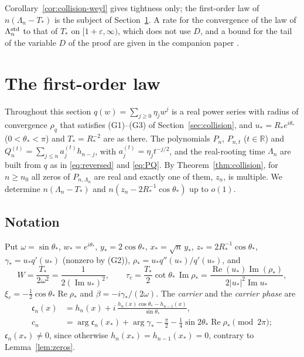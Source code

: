 \documentclass[11pt]{amsart}
\theoremstyle{definition}
\theoremstyle{remark}
\numberwithin{equation}{section}
\newcommand{\R}{\mathbb{R}}
\newcommand{\eps}{\varepsilon}
\DeclareMathOperator{\re}{Re}
\DeclareMathOperator{\im}{Im}
\begin{document}
Corollary~\ref{cor:collision-weyl} gives tightness only; the first-order law of $n(\Lambda_n-T_*)$ is the subject of Section~\ref{sec:firstorder}. A rate for the convergence of the law of $\Lambda_n^{\rm std}$ to that of $T_*$ on $[1+\eps,\infty)$, which does not use $D$, and a bound for the tail of the variable $D$ of the proof are given in the companion paper \cite{CompA}. %


\section{The first-order law}\label{sec:firstorder}

Throughout this section $q(w)=\sum_{j\ge0}\eta_jw^j$ is a real power series with radius of convergence $\rho_q$ that
satisfies (G1)--(G3) of Section~\ref{sec:collision}, and $u_*=R_*e^{i\theta_*}$ ($0<\theta_*<\pi$) and $T_*=R_*^{-2}$
are as there. The polynomials $P_n$, $P_{n,t}$ ($t\in\R$) and $Q_n^{(t)}=\sum_{j\le n}a^{(t)}_jh_{n-j}$, with
$a^{(t)}_j=\eta_jt^{-j/2}$, and the real-rooting time $\Lambda_n$ are built from $q$ as in \eqref{eq:reversed} and
\eqref{eq:PQ}. By Theorem~\ref{thm:collision}, for $n\ge n_0$ all zeros of $P_{n,\Lambda_n}$ are real and exactly one of
them, $z_n$, is multiple. We determine $n(\Lambda_n-T_*)$ and $n(z_n-2R_*^{-1}\cos\theta_*)$ up to $o(1)$.

\subsection*{Notation}
Put $\omega=\sin\theta_*$, $w_*=e^{i\theta_*}$, $y_*=2\cos\theta_*$, $x_*=\sqrt n\,y_*$, $z_*=2R_*^{-1}\cos\theta_*$,
$\gamma_*=u_*q'(u_*)$ (nonzero by (G2)), $\rho_*=u_*q''(u_*)/q'(u_*)$, and
\[
W=\frac{T_*}{2\omega^2}=\frac1{2(\im u_*)^2},\qquad
\tau_c=\frac{T_*}2\cot\theta_*\,\im\rho_*=\frac{\re(u_*)\im(\rho_*)}{2|u_*|^2\im u_*},
\]
$\xi_r=-\frac12\cos\theta_*\re\rho_*$ and $\beta=-i\gamma_*/(2\omega)$. The \emph{carrier} and the \emph{carrier phase} are
\begin{align*}
\mathfrak c_n(x)&=h_n(x)+i\,\frac{h_n(x)\cos\theta_*-h_{n-1}(x)}{\sin\theta_*},\\
c_n&=\arg\mathfrak c_n(x_*)+\arg\gamma_*-\frac\pi2-\frac14\sin2\theta_*\re\rho_*\pmod{2\pi};
\end{align*}
$\mathfrak c_n(x_*)\ne0$, since otherwise $h_n(x_*)=h_{n-1}(x_*)=0$, contrary to Lemma~\ref{lem:zeros}.
\end{document}
